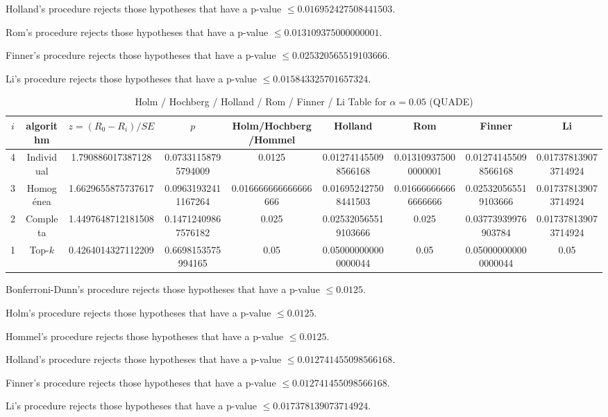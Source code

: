 \documentclass[a4paper,10pt]{article}
\begin{document}
\begin{landscape}
Holland's procedure rejects those hypotheses that have a p-value $\le0.016952427508441503$.


Rom's procedure rejects those hypotheses that have a p-value $\le0.013109375000000001$.


Finner's procedure rejects those hypotheses that have a p-value $\le0.025320565519103666$.


Li's procedure rejects those hypotheses that have a p-value $\le0.015843325701657324$.



\newpage

\begin{table}[!htp]
\centering\scriptsize
\caption{Holm / Hochberg / Holland / Rom / Finner / Li Table for $\alpha=0.05$ (QUADE)}
\begin{tabular}{ccccccccc}
$i$&algorithm&$z=(R_0 - R_i)/SE$&$p$&Holm/Hochberg/Hommel&Holland&Rom&Finner&Li\\
\hline
4&Individual&1.790886017387128&0.07331158795794009&0.0125&0.012741455098566168&0.013109375000000001&0.012741455098566168&0.017378139073714924\\
3&Homogénea&1.6629655875737617&0.09631932411167264&0.016666666666666666&0.016952427508441503&0.016666666666666666&0.025320565519103666&0.017378139073714924\\
2&Completa&1.4497648712181508&0.14712409867576182&0.025&0.025320565519103666&0.025&0.03773939976903784&0.017378139073714924\\
1&Top-$k$&0.4264014327112209&0.6698153575994165&0.05&0.050000000000000044&0.05&0.050000000000000044&0.05\\
\hline
\end{tabular}
\end{table}
Bonferroni-Dunn's procedure rejects those hypotheses that have a p-value $\le0.0125$.


Holm's procedure rejects those hypotheses that have a p-value $\le0.0125$.


Hommel's procedure rejects those hypotheses that have a p-value $\le0.0125$.


Holland's procedure rejects those hypotheses that have a p-value $\le0.012741455098566168$.


Finner's procedure rejects those hypotheses that have a p-value $\le0.012741455098566168$.


Li's procedure rejects those hypotheses that have a p-value $\le0.017378139073714924$.



\newpage


\end{landscape}
\end{document}
